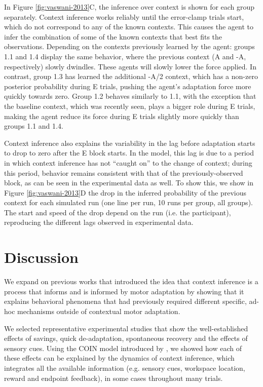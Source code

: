 \documentclass[a4paper,doc,floatsintext,natbib]{apa6}
\def \fref #1{Figure \ref{#1}}     %
\begin{document}
In \fref{fig:vaswani-2013}C, the inference over context is shown for each group separately. Context inference works reliably until the error-clamp trials start, which do not correspond to any of the known contexts. This causes the agent to infer the combination of some of the known contexts that best fits the observations. Depending on the contexts previously learned by the agent: groups 1.1 and 1.4 display the same behavior, where the previous context (A and -A, respectively) slowly dwindles. These agents will slowly lower the force applied. In contrast, group 1.3 has learned the additional -A/2 context, which has a non-zero posterior probability during E trials, pushing the agent's adaptation force more quickly towards zero. Group 1.2 behaves similarly to 1.1, with the exception that the baseline context, which was recently seen, plays a bigger role during E trials, making the agent reduce its force during E trials slightly more quickly than groups 1.1 and 1.4. 

Context inference also explains the variability in the lag before adaptation starts to drop to zero after the E block starts. In the model, this lag is due to a period in which context inference has not ``caught on'' to the change of context; during this period, behavior remains consistent with that of the previously-observed block, as can be seen in the experimental data as well. To show this, we show in \fref{fig:vaswani-2013}D the drop in the inferred probability of the previous context for each simulated run (one line per run, 10 runs per group, all groups). The start and speed of the drop depend on the run (i.e. the participant), reproducing the different lags observed in experimental data.

\section{Discussion}
We expand on previous works \cite{Heald_Contextual_2021,Oh_Minimizing_2019} that introduced the idea that context inference is a process that informs and is informed by motor adaptation by showing that it explains behavioral phenomena that had previously required different specific, ad-hoc mechanisms outside of contextual motor adaptation. 

We selected representative experimental studies that show the well-established effects of savings, quick de-adaptation, spontaneous recovery and the effects of sensory cues. Using the COIN model introduced by \cite{Heald_Contextual_2021}, we showed how each of these effects can be explained by the dynamics of context inference, which integrates all the available information (e.g. sensory cues, workspace location, reward and endpoint feedback), in some cases throughout many trials.
\end{document}
